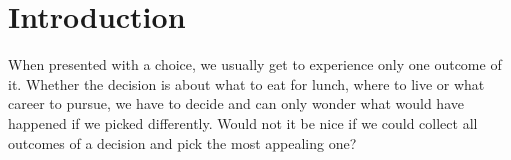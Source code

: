 \documentclass[a4paper, 11pt, fleqn]{scrreprt}
\begin{document}

\renewcommand{\contentsname}{Contents}
\tableofcontents   %

\newpage               %

\chapter{Introduction}
When presented with a choice, we usually get to experience only one outcome of it. Whether the decision is about what to eat for lunch, where to live or what career to pursue, we have to decide and can only wonder what would have happened if we picked differently. Would not it be nice if we could collect all outcomes of a decision and pick the most appealing one?
\end{document}

